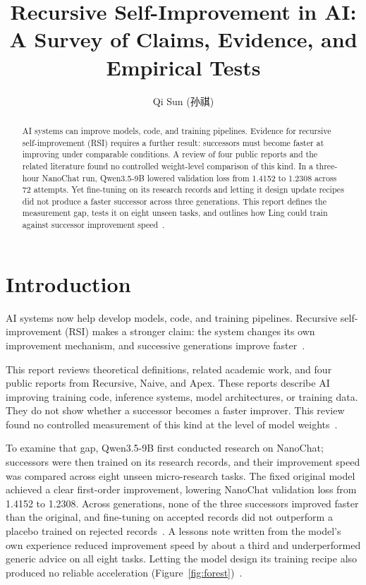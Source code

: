 \documentclass{article}
\title{Recursive Self-Improvement in AI: A Survey of Claims, Evidence, and Empirical Tests}
\author{%
  Qi Sun (孙祺)
}
\begin{document}
\maketitle

\begin{abstract}
AI systems can improve models, code, and training pipelines. Evidence for recursive self-improvement (RSI) requires a further result: successors must become faster at improving under comparable conditions. A review of four public reports and the related literature found no controlled weight-level comparison of this kind. In a three-hour NanoChat run, Qwen3.5-9B lowered validation loss from 1.4152 to 1.2308 across 72 attempts. Yet fine-tuning on its research records and letting it design update recipes did not produce a faster successor across three generations. This report defines the measurement gap, tests it on eight unseen tasks, and outlines how Ling could train against successor improvement speed~\cite{E-28,lit-rsi-academic-md,LOG-E,decisions-decisions-1420-json}.
\end{abstract}

\section{Introduction}

AI systems now help develop models, code, and training pipelines. Recursive self-improvement (RSI) makes a stronger claim: the system changes its own improvement mechanism, and successive generations improve faster~\cite{T-05,T-12,T-24}.

This report reviews theoretical definitions, related academic work, and four public reports from Recursive, Naive, and Apex. These reports describe AI improving training code, inference systems, model architectures, or training data. They do not show whether a successor becomes a faster improver. This review found no controlled measurement of this kind at the level of model weights~\cite{E-28}\cite[\S1, \S6]{lit-rsi-academic-md}.

To examine that gap, Qwen3.5-9B first conducted research on NanoChat; successors were then trained on its research records, and their improvement speed was compared across eight unseen micro-research tasks. The fixed original model achieved a clear first-order improvement, lowering NanoChat validation loss from 1.4152 to 1.2308. Across generations, none of the three successors improved faster than the original, and fine-tuning on accepted records did not outperform a placebo trained on rejected records~\cite{LOG-E,decisions-decisions-1420-json}. A lessons note written from the model's own experience reduced improvement speed by about a third and underperformed generic advice on all eight tasks. Letting the model design its training recipe also produced no reliable acceleration (Figure~\ref{fig:forest})~\cite{LOG-E,decisions-decisions-1420-json}. 
\end{document}
